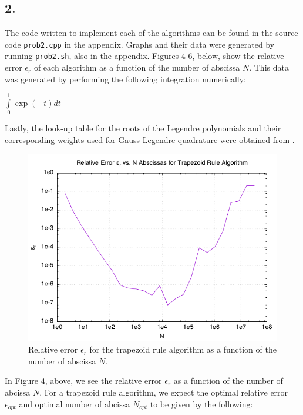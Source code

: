 \documentclass[12pt,letterpaper]{article}
\begin{document}
\subsection*{2.}

The code written to implement each of the algorithms can be found in the source code \verb|prob2.cpp| in the appendix. Graphs and their data were generated by running \verb|prob2.sh|, also in the appendix. Figures 4-6, below, show the relative error $\epsilon_r$ of each algorithm as a function of the number of abscissa $N$. This data was generated by performing the following integration numerically:

\begin{center}
	$\displaystyle \int\limits_{0}^{1} \exp(-t) dt$
\end{center}

Lastly, the look-up table for the roots of the Legendre polynomials and their corresponding weights used for Gauss-Legendre quadrature were obtained from \cite{projecteuclid}.

\begin{figure}[H]
	\centering
	\includegraphics[scale=0.6]{trapezoid_rule.png}
	\caption{Relative error $\epsilon_r$ for the trapezoid rule algorithm as a function of the number of abscissa $N$.}
\end{figure}

In Figure 4, above, we see the relative error $\epsilon_r$ as a function of the number of abcissa $N$. For a trapezoid rule algorithm, we expect the optimal relative error $\epsilon_{opt}$ and optimal number of abcissa $N_{opt}$ to be given by the following:
\end{document}
